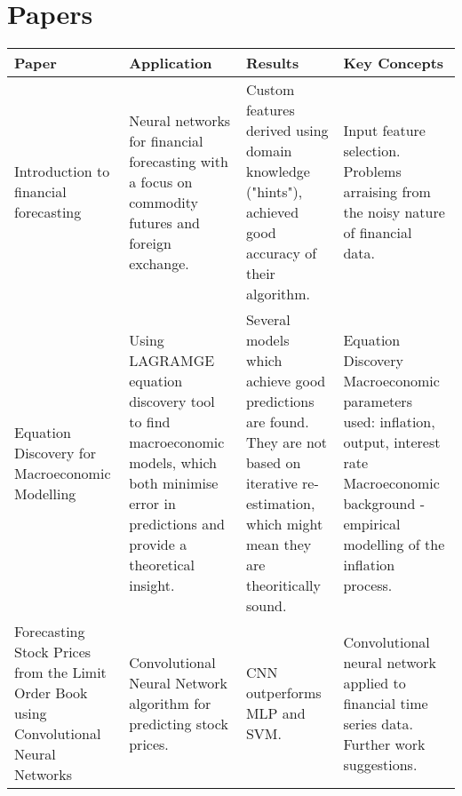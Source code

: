 \documentclass[10pt]{article}
\begin{document}
\section{Papers}
\begin{center}

	\begin{longtable}{ | P | P | P | P |}
  
    \hline
    Paper & Application & Results & Key Concepts \\ \hline
    Introduction to financial forecasting \cite{Abu-Mostafa1996}
	& 
	Neural networks for financial forecasting with a focus on commodity futures and foreign exchange. 
	&
	Custom features derived using domain knowledge ("hints"), achieved good accuracy of their algorithm. 
	& 
    Input feature selection. \linebreak Problems arraising from the noisy nature of financial data. 
    \\  \hline
	Equation Discovery for Macroeconomic Modelling  \cite{dimitar}  
    &
    Using LAGRAMGE equation discovery tool to find macroeconomic models, which both minimise error in predictions and provide a theoretical insight. 
    &
    Several models which achieve good predictions are found. They are not based on iterative re-estimation, which might mean they are theoritically sound.
    &
    Equation Discovery 
    \linebreak
    Macroeconomic parameters used: inflation, output, interest rate
    \linebreak
    Macroeconomic background - empirical modelling of the inflation process.
   	\\  \hline
   	
	Forecasting Stock Prices from the Limit Order
Book using Convolutional Neural Networks  \cite{Tsantekidis}  
    &
    Convolutional Neural Network algorithm for predicting stock prices.
    &
    CNN outperforms MLP and SVM.
    &
    Convolutional neural network applied to financial time series data.
    Further work suggestions.
   	\\  \hline
   	

\end{longtable}
\end{center}
\end{document}

